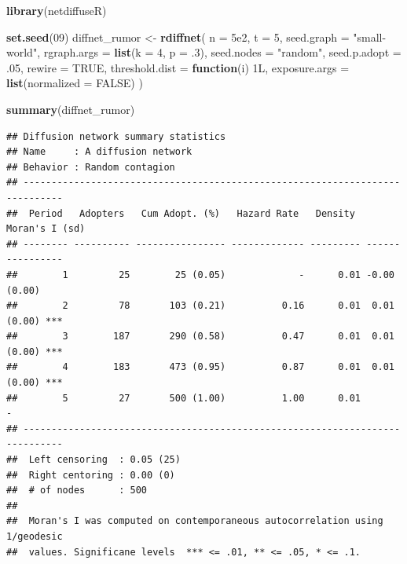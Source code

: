 \documentclass[]{book}
\newenvironment{Shaded}{\begin{snugshade}}{\end{snugshade}}
\newcommand{\ControlFlowTok}[1]{\textcolor[rgb]{0.13,0.29,0.53}{\textbf{#1}}}
\newcommand{\DataTypeTok}[1]{\textcolor[rgb]{0.13,0.29,0.53}{#1}}
\newcommand{\DecValTok}[1]{\textcolor[rgb]{0.00,0.00,0.81}{#1}}
\newcommand{\FloatTok}[1]{\textcolor[rgb]{0.00,0.00,0.81}{#1}}
\newcommand{\KeywordTok}[1]{\textcolor[rgb]{0.13,0.29,0.53}{\textbf{#1}}}
\newcommand{\NormalTok}[1]{#1}
\newcommand{\OtherTok}[1]{\textcolor[rgb]{0.56,0.35,0.01}{#1}}
\newcommand{\StringTok}[1]{\textcolor[rgb]{0.31,0.60,0.02}{#1}}
\begin{document}
\begin{Shaded}
\begin{Highlighting}[]
\KeywordTok{library}\NormalTok{(netdiffuseR)}

\KeywordTok{set.seed}\NormalTok{(}\DecValTok{09}\NormalTok{)}
\NormalTok{diffnet_rumor <-}\StringTok{ }\KeywordTok{rdiffnet}\NormalTok{(}
  \DataTypeTok{n =} \FloatTok{5e2}\NormalTok{,}
  \DataTypeTok{t =} \DecValTok{5}\NormalTok{, }
  \DataTypeTok{seed.graph =} \StringTok{"small-world"}\NormalTok{,}
  \DataTypeTok{rgraph.args =} \KeywordTok{list}\NormalTok{(}\DataTypeTok{k =} \DecValTok{4}\NormalTok{, }\DataTypeTok{p =} \FloatTok{.3}\NormalTok{),}
  \DataTypeTok{seed.nodes =} \StringTok{"random"}\NormalTok{,}
  \DataTypeTok{seed.p.adopt =} \FloatTok{.05}\NormalTok{,}
  \DataTypeTok{rewire =} \OtherTok{TRUE}\NormalTok{,}
  \DataTypeTok{threshold.dist =} \ControlFlowTok{function}\NormalTok{(i) 1L,}
  \DataTypeTok{exposure.args =} \KeywordTok{list}\NormalTok{(}\DataTypeTok{normalized =} \OtherTok{FALSE}\NormalTok{)}
\NormalTok{  )}
\end{Highlighting}
\end{Shaded}

\begin{Shaded}
\begin{Highlighting}[]
\KeywordTok{summary}\NormalTok{(diffnet_rumor)}
\end{Highlighting}
\end{Shaded}

\begin{verbatim}
## Diffusion network summary statistics
## Name     : A diffusion network
## Behavior : Random contagion
## -----------------------------------------------------------------------------
##  Period   Adopters   Cum Adopt. (%)   Hazard Rate   Density   Moran's I (sd)  
## -------- ---------- ---------------- ------------- --------- ---------------- 
##        1         25        25 (0.05)             -      0.01 -0.00 (0.00)     
##        2         78       103 (0.21)          0.16      0.01  0.01 (0.00) *** 
##        3        187       290 (0.58)          0.47      0.01  0.01 (0.00) *** 
##        4        183       473 (0.95)          0.87      0.01  0.01 (0.00) *** 
##        5         27       500 (1.00)          1.00      0.01               -  
## -----------------------------------------------------------------------------
##  Left censoring  : 0.05 (25)
##  Right centoring : 0.00 (0)
##  # of nodes      : 500
## 
##  Moran's I was computed on contemporaneous autocorrelation using 1/geodesic
##  values. Significane levels  *** <= .01, ** <= .05, * <= .1.
\end{verbatim}
\end{document}
